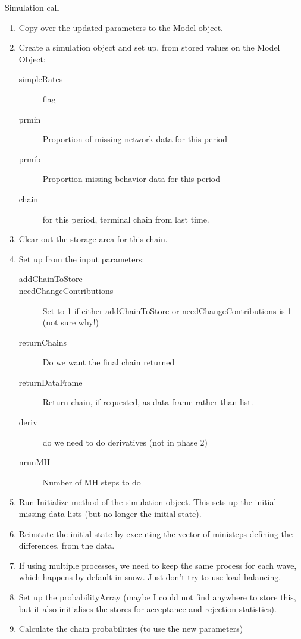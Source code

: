 \documentclass[12pt,a4paper]{article}
\makeatletter
\renewcommand{\=}{\,=\,}
\newcommand{\+}{\,+\,}
\renewcommand{\section}{\@startsection{section}{1}
                {0pt}{\baselineskip}{0.5\baselineskip}
                {\centering\sffamily} }
\makeatother
\begin{document}
 \section{Simulation  call}
\begin{enumerate}
\item Copy over the updated parameters to the Model object.
\item Create a simulation object and set up, from stored values on the Model
  Object:
\begin{description}
\item[simpleRates] flag
\item[prmin] Proportion of missing network data for this period
\item[prmib] Proportion missing behavior data for this period
\item[chain] for this period, terminal chain from last time.
\end{description}
\item Clear out the storage area for this chain.
\item Set up from the input parameters:
\begin{description}
\item[addChainToStore]
\item[needChangeContributions] Set to 1 if either addChainToStore or
  needChangeContributions is 1 (not sure why!)
\item[returnChains] Do we want the final chain returned
\item[returnDataFrame] Return chain, if requested, as data frame rather than
  list.
\item[deriv] do we need to do derivatives (not in phase 2)
\item[nrunMH] Number of MH steps to do
\end{description}
\item Run Initialize method of the simulation object. This sets up the initial
  missing data lists (but no longer the initial state).
\item Reinstate the
  initial state by executing the vector of ministeps defining the differences.
  from the data.
\item If using multiple processes, we need to keep the same process for each
  wave, which happens by default in snow. Just don't try to use load-balancing.
\item Set up the probabilityArray (maybe I could not find anywhere to store
  this, but it also initialises the stores for acceptance and rejection
  statistics).
\item Calculate the chain probabilities (to use the new parameters)

\end{enumerate}
\end{document}
